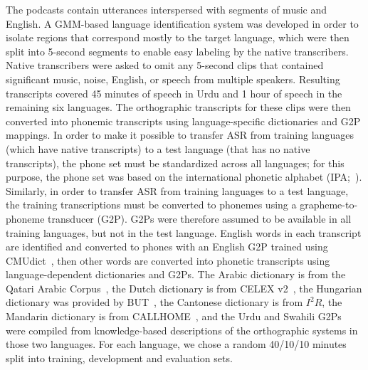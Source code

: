 The podcasts contain utterances interspersed with segments of music
and English. A GMM-based language identification system was
developed in order to isolate
regions that correspond mostly to the target language, which
were then split into 5-second
segments to enable easy labeling by the native transcribers.
Native transcribers were asked to omit any 5-second clips that
contained significant music, noise, English, or speech from multiple
speakers. Resulting transcripts covered 45 minutes of speech in Urdu
and 1 hour of speech in the remaining six languages. The orthographic
transcripts for these clips were then converted into phonemic
transcripts using language-specific dictionaries and G2P mappings.
{\color{blue} In order to make it possible to transfer ASR from
  training languages (which have native transcripts) to a test
  language (that has no native transcripts), the phone set must be
  standardized across all languages; for this purpose, the phone set
  was based on the international phonetic alphabet
  (IPA;~\cite{ipa1993}).  Similarly, in order to transfer ASR from
  training languages to a test language, the training transcriptions
  must be converted to phonemes using a grapheme-to-phoneme transducer
  (G2P).  G2Ps were therefore assumed to be available in all training
  languages, but not in the test language.}  English words in each
transcript are identified and converted to phones with an English G2P
trained using CMUdict~\cite{Lenzo1995}, then other words are converted
into phonetic transcripts using language-dependent dictionaries and
G2Ps.
The Arabic dictionary is from the Qatari Arabic Corpus~\cite{Elmahdy14},
the Dutch dictionary is from CELEX v2~\cite{Baayen96},
the Hungarian dictionary was provided by BUT~\cite{Grezl14},
the Cantonese dictionary is from $I^2R$,
the Mandarin dictionary is from CALLHOME~\cite{LDC96},
and the Urdu and Swahili G2Ps were compiled from
knowledge-based descriptions of the orthographic systems in those
two languages. 
For
each language, we chose a random 40/10/10 minutes split into training,
development and evaluation sets.

